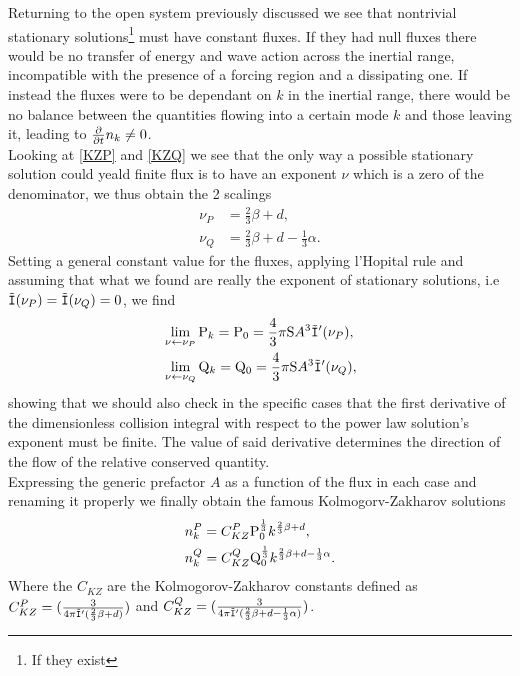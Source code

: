 Returning to the open system previously discussed we see that nontrivial stationary solutions\footnote{If they exist} must have constant fluxes. If they had null fluxes
there would be no transfer of energy and wave action across the inertial range, incompatible with the presence of a forcing region and a dissipating one. If instead the fluxes
were to be dependant on $k$ in the inertial range, there would be no balance between the quantities flowing into a certain mode $k$ and those leaving it, leading to 
$\frac{\partial}{\partial t} n_k \neq 0$. \\
Looking at \eqref{KZP} and \eqref{KZQ} we see that the only way a possible stationary solution could yeald finite flux is to have an exponent $\nu$ which is a zero of 
the denominator, we thus obtain the 2 scalings
\begin{align}
    \nu_P &= \frac{2}{3}\beta + d, \\
    \nu_Q &= \frac{2}{3}\beta + d - \frac{1}{3}\alpha.
\end{align}
Setting a general constant value for the fluxes, applying l'Hopital rule and assuming that what we found are really the exponent of stationary solutions, i.e 
$\tilde{\mathtt{I}}(\nu_P)=\tilde{\mathtt{I}}(\nu_Q)=0$, we find 
\begin{align}
& \lim_{\nu \leftarrow \nu_P}  \mathrm{P}_k = \mathrm{P}_0 = \frac{4}{3}\pi \mathrm{S} A^3 \tilde{\mathtt{I}}'(\nu_P),     \\
& \lim_{\nu \leftarrow \nu_Q}  \mathrm{Q}_k = \mathrm{Q}_0 = \frac{4}{3}\pi \mathrm{S} A^3 \tilde{\mathtt{I}}'(\nu_Q), 
\end{align}
showing that we should also check in the specific cases that the first derivative of the dimensionless collision integral with respect to the power law solution's 
exponent must be finite. The value of said derivative determines the direction of the flow of the relative conserved quantity. \\
Expressing the generic prefactor $A$ as a function of the flux in each case and renaming it properly we finally obtain the famous Kolmogorv-Zakharov solutions 
\begin{align}
    &n_k^P = C_{KZ}^P \mathrm{P}_0^{\frac{1}{3}} k^{\frac{2}{3}\beta + d}, \\
    &n_k^Q = C_{KZ}^Q \mathrm{Q}_0^{\frac{1}{3}} k^{\frac{2}{3}\beta + d - \frac{1}{3}\alpha}.
\end{align}
Where the $C_{KZ}$ are the Kolmogorov-Zakharov constants defined as $C_{KZ}^P = (\frac{3}{4\pi\tilde{\mathtt{I}}'(\frac{2}{3}\beta + d)})$ and 
$C_{KZ}^Q = (\frac{3}{4\pi\tilde{\mathtt{I}}'(\frac{2}{3}\beta + d - \frac{1}{3}\alpha)})$. \\
